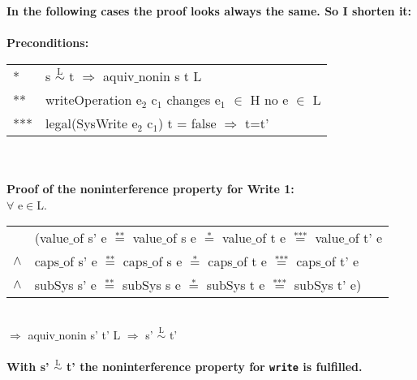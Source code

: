 \textbf{In the following cases the proof looks always the same. So I shorten it:} \\ \\
\textbf{Preconditions:} \\ 
\begin{tabular}{ll}
* & s $\overset{\text{L}}{\sim}$ t $\Rightarrow$ aquiv$\_$nonin s t L	\\ 
** & writeOperation e$_2$ c$_1$  changes e$_1$ $\in$ H no e $\in$ L \\
*** & legal(SysWrite e$_2$ c$_1$) t = false $\Rightarrow$ t=t'
\end{tabular} \\ \\ 
\textbf{Proof of the noninterference property for Write 1:} \\ 
$\forall$ e$\in$L. \\
\begin{tabular}{ll}
& (value$\_$of s' e $\overset{\text{**}}{=}$ value$\_$of s e $\overset{\text{*}}{=}$ value$\_$of t e $\overset{\text{***}}{=}$ value$\_$of t' e \\
$\wedge$ & caps$\_$of s' e $\overset{\text{**}}{=}$ caps$\_$of s e $\overset{\text{*}}{=}$ caps$\_$of t e $\overset{\text{***}}{=}$ caps$\_$of t' e \\
$\wedge$ & subSys s' e $\overset{\text{**}}{=}$ subSys s e $\overset{\text{*}}{=}$ subSys t e $\overset{\text{***}}{=}$ subSys t' e)
\end{tabular} \\
$\Rightarrow$ aquiv$\_$nonin s' t' L $\Rightarrow$ s' $\overset{\text{L}}{\sim}$ t' \\ \\
\textbf{With s' $\overset{\text{L}}{\sim}$ t' the noninterference property for \texttt{write} is fulfilled.} 